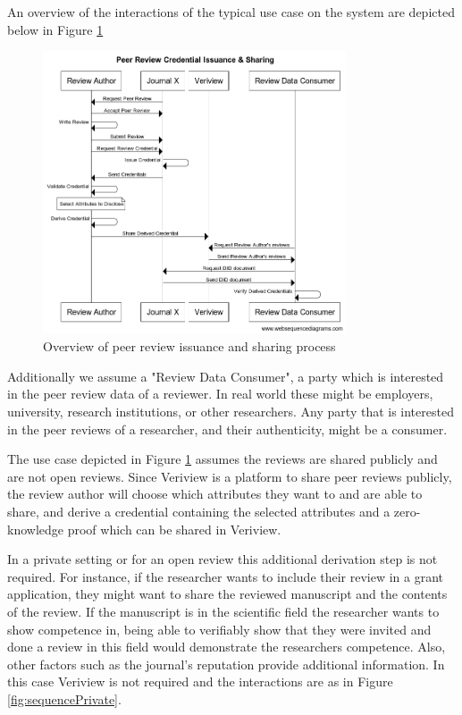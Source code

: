 An overview of the interactions of the typical use case on the system are depicted below in Figure \ref{fig:sequence1} 

\begin{figure}[htpb]
  \centering
  \includegraphics[width=0.8\textwidth]{figures/sequence.png}
  \caption{Overview of peer review issuance and sharing process} \label{fig:sequence1}
\end{figure}

Additionally we assume a "Review Data Consumer", a party which is interested in the peer review data of a reviewer. In real world these might be employers, university, research institutions, or other researchers. Any party that is interested in the peer reviews of a researcher, and their authenticity, might be a consumer. 

The use case depicted in Figure \ref{fig:sequence1} assumes the reviews are shared publicly and are not open reviews. Since Veriview is a platform to share peer reviews publicly, the review author will choose which attributes they want to and are able to share, and derive a credential containing the selected attributes and a zero-knowledge proof which can be shared in Veriview. 

In a private setting or for an open review this additional derivation step is not required. For instance, if the researcher wants to include their review in a grant application, they might want to share the reviewed manuscript and the contents of the review. If the manuscript is in the scientific field the researcher wants to show competence in, being able to verifiably show that they were invited and done a review in this field  would demonstrate the researchers competence. Also, other factors such as the journal's reputation provide additional information. In this case Veriview is not required and the interactions are as in Figure \ref{fig:sequencePrivate}.

